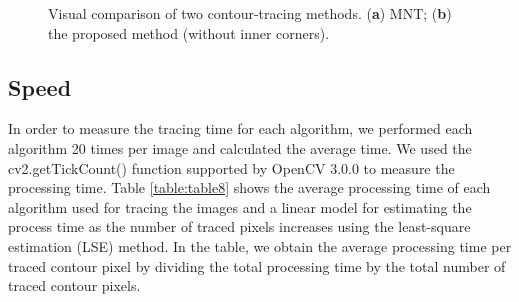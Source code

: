 \documentclass[sensors,article,accept,moreauthors,pdftex,10pt,a4paper]{mdpi}
\begin{document}
\begin{figure}[H]
	\centering

	\caption{Visual comparison of two contour-tracing methods. (\textbf{a}) MNT; (\textbf{b}) the proposed method (without inner corners).}
	\label{fig:image17}
\end{figure}


\subsection{Speed}


In order to measure the tracing time for each algorithm, we performed each algorithm 20 times per image and calculated the average time. We used the cv2.getTickCount() function supported by OpenCV 3.0.0 to measure the processing time. Table \ref{table:table8} shows the average processing time of each algorithm used for tracing the images and a linear model for estimating the process time as the number of traced pixels increases using the least-square estimation (LSE) method. In the table, we obtain the average processing time per traced contour pixel by dividing the total processing time by the total number of traced contour pixels.
\end{document}
